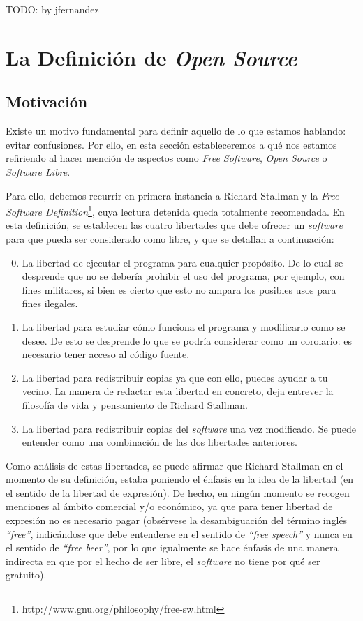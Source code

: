 TODO: by jfernandez

\section{La Definición de \textit{Open Source}}

\subsection{Motivación}
\label{SUBSEC:DefinicionMotivacion}

Existe un motivo fundamental para definir aquello de lo que estamos hablando:
evitar confusiones. Por ello, en esta sección estableceremos a qué nos estamos
refiriendo al hacer mención de aspectos como \textit{Free Software},
\textit{Open Source} o \textit{Software Libre}.

Para ello, debemos recurrir en primera instancia a Richard Stallman y la
\textit{Free
Software Definition}\footnote{http://www.gnu.org/philosophy/free-sw.html}, cuya
lectura detenida queda totalmente recomendada. En esta definición, se establecen
las cuatro libertades que debe ofrecer un \textit{software} para que pueda ser
considerado como libre, y que se detallan a continuación:

\begin{enumerate}
  \setcounter{enumi}{-1}
  \item La libertad de ejecutar el programa para cualquier propósito. De lo
cual se desprende que no se debería prohibir el uso del programa, por ejemplo,
con fines militares, si bien es cierto que esto no ampara los posibles usos para
fines ilegales.
  \item La libertad para estudiar cómo funciona el programa y modificarlo como
se desee. De esto se desprende lo que se podría considerar como un corolario:
es necesario tener acceso al código fuente.
  \item La libertad para redistribuir copias ya que con ello, puedes ayudar a
tu vecino. La manera de redactar esta libertad en concreto, deja entrever la
filosofía de vida y pensamiento de Richard Stallman.
  \item La libertad para redistribuir copias del \textit{software} una vez
modificado. Se puede entender como una combinación de las dos libertades
anteriores.
\end{enumerate}

Como análisis de estas libertades, se puede afirmar que Richard Stallman en el
momento de su definición, estaba poniendo el énfasis en la idea de la libertad
(en el sentido de la libertad de expresión). De hecho, en ningún momento se
recogen menciones al ámbito comercial y/o económico, ya que para tener libertad
de expresión no es necesario pagar (obsérvese la desambiguación del término
inglés \textit{``free''}, indicándose que debe entenderse en el sentido de
\textit{``free speech''} y nunca en el sentido de \textit{``free beer''}, por lo
que igualmente se hace énfasis de una manera indirecta en que por el hecho de
ser libre, el \textit{software} no tiene por qué ser gratuito).

